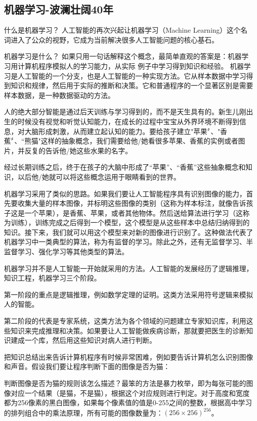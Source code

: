 \subsection{机器学习-波澜壮阔40年}

什么是机器学习？
人工智能的再次兴起让机器学习（Machine Learning）这个名词进入了公众的视野，它成为当前解决很多人工智能问题的核心基石。

机器学习是什么？
如果只用一句话解释这个概念，最简单直观的答案是：机器学习用计算机程序模拟人的学习能力，从实际
例子中学习得到知识和经验。
机器学习是人工智能的一个分支，也是人工智能的一种实现方法。它从样本数据中学习得到知识和规律，然后用于实际的推断和决策。它和普通程序的一个显著区别是需要样本数据，是一种数据驱动的方法。

人的绝大部分智能是通过后天训练与学习得到的，而不是天生具有的。新生儿刚出生的时候没有视觉和听觉认知能力，在成长的过程中宝宝从外界环境不断得到信息，对大脑形成刺激，从而建立起认知的能力。要给孩子建立"苹果〞、"香蕉〞、“熊猫"这样的抽象概念，我们需要给他/她看很多苹果、香蕉的实例或者图片，并反复的告诉他/她这些水果的名字。

经过长期训练之后，终于在孩子的大脑中形成了“苹果”、“香蕉”这些抽象概念和知识，以后他/她就可以将这些概念运用于眼睛看到的世界。

机器学习采用了类似的思路。如果我们要让人工智能程序具有识别图像的能力，首先要收集大量的样本图像，并标明这些图像的类别（这称为样本标注，就像告诉孩子这是一个苹果），是香蕉、苹果，或者其他物体。然后送给算法进行学习（这称为训练），训练完成之后得到一个模型，这个模型是从这些样本中总结归纳得到的知识。接下来，我们就可以用这个模型来对新的图像进行识别了。这种做法代表了机器学习中一类典型的算法，称为有监督的学习。除此之外，还有无监督学习、半监督学习、强化学习等其他类型的算法。

机器学习并不是人工智能一开始就采用的方法。人工智能的发展经历了逻辑推理，知识工程，机器学习三个阶段。

第一阶段的重点是逻辑推理，例如数学定理的证明。这类方法采用符号逻辑来模拟人的智能。

第二阶段的代表是专家系统，这类方法为各个领域的问题建立专家知识库，利用这些知识来完成推理和决策。如果要让人工智能做疾病诊断，那就要把医生的诊断知识建成一个库，然后用这些知识对病人进行判断。

把知识总结出来告诉计算机程序有时候非常困难，例如要告诉计算机怎么识别图像和声音。假设我们要让程序判断下面的图像是否为猫：

判断图像是否为猫的规则该怎么描述？最笨的方法是暴力枚举，即为每张可能的图像对应一个结果（是猫，不是猫），根据这个对应规则进行判定。对于高度和宽度都为256像素的黑白图像，如果每个像素值的值是0-255之间的整数，根据高中学习的排列组合中的乘法原理，所有可能的图像数量为：$\left(256\times 256\right)^256$。

